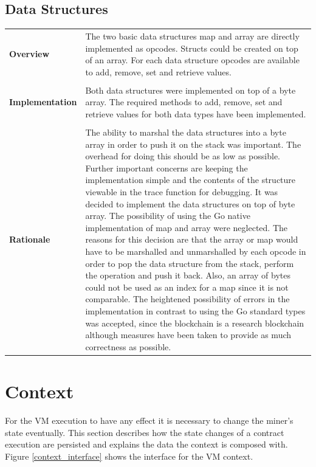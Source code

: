 \subsection{Data Structures}
\begin{tabular}[t]{ p{3cm} p{12.5cm}}
\raggedright
\textbf{Overview} &
The two basic data structures map and array are directly implemented as opcodes. Structs could be created on top of an array. For each data structure opcodes are available to add, remove, set and retrieve values.\\ \\

\raggedright
\textbf{Implementation} &
Both data structures were implemented on top of a byte array. 
The required methods to add, remove, set and retrieve values for both data types have been implemented.
 \\ \\

\raggedright
\textbf{Rationale} &
The ability to marshal the data structures into a byte array in order to push it on the stack was important. The overhead for doing this should be as low as possible. Further important concerns are keeping the implementation simple and the contents of the structure viewable in the trace function for debugging. It was decided to implement the data structures on top of byte array. The possibility of using the Go native implementation of map and array were neglected. The reasons for this decision are that the array or map would have to be marshalled and unmarshalled by each opcode in order to pop the data structure from the stack, perform the operation and push it back. Also, an array of bytes could not be used as an index for a map since it is not comparable. The heightened possibility of errors in the implementation in contrast to using the Go standard types was accepted, since the blockchain is a research blockchain although measures have been taken to provide as much correctness as possible.
\end{tabular}

\section{Context}
For the VM execution to have any effect it is necessary to change the miner's state eventually. This section describes how the state changes of a contract execution are persisted and explains the data the context is composed with. Figure \ref{context_interface} shows the interface for the VM context.

